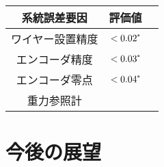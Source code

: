 \documentclass[../../main.tex]{subfiles}
\begin{document}
\begin{table}
    \centering
    \caption{}
    \begin{tabular}{ccc}
        \hline\hline
        系統誤差要因 & 評価値 \\
        \hline
        ワイヤー設置精度 & $<0.02\tcdegree$ \\
        エンコーダ精度 & $<0.03\tcdegree$ \\
        エンコーダ零点 & $<0.04\tcdegree$ \\
        重力参照計 & 
    \end{tabular}
    
\end{table}





\section{今後の展望}
\end{document}
